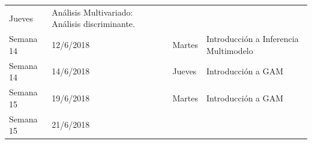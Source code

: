 \documentclass[]{book}
\theoremstyle{definition}
\theoremstyle{definition}
\theoremstyle{definition}
\theoremstyle{remark}
\begin{document}
\begin{longtable}[]{@{}llll@{}}
\begin{minipage}[t]{0.05\columnwidth}
Jueves\strut
\end{minipage} & \begin{minipage}[t]{0.69\columnwidth}\raggedright
Análisis Multivariado: Análisis discriminante.\strut
\end{minipage}\tabularnewline
\begin{minipage}[t]{0.07\columnwidth}\raggedright
Semana 14\strut
\end{minipage} & \begin{minipage}[t]{0.07\columnwidth}\raggedright
12/6/2018\strut
\end{minipage} & \begin{minipage}[t]{0.05\columnwidth}\raggedright
Martes\strut
\end{minipage} & \begin{minipage}[t]{0.69\columnwidth}\raggedright
Introducción a Inferencia Multimodelo\strut
\end{minipage}\tabularnewline
\begin{minipage}[t]{0.07\columnwidth}\raggedright
Semana 14\strut
\end{minipage} & \begin{minipage}[t]{0.07\columnwidth}\raggedright
14/6/2018\strut
\end{minipage} & \begin{minipage}[t]{0.05\columnwidth}\raggedright
Jueves\strut
\end{minipage} & \begin{minipage}[t]{0.69\columnwidth}\raggedright
Introducción a GAM\strut
\end{minipage}\tabularnewline
\begin{minipage}[t]{0.07\columnwidth}\raggedright
Semana 15\strut
\end{minipage} & \begin{minipage}[t]{0.07\columnwidth}\raggedright
19/6/2018\strut
\end{minipage} & \begin{minipage}[t]{0.05\columnwidth}\raggedright
Martes\strut
\end{minipage} & \begin{minipage}[t]{0.69\columnwidth}\raggedright
Introducción a GAM\strut
\end{minipage}\tabularnewline
\begin{minipage}[t]{0.07\columnwidth}\raggedright
Semana 15\strut
\end{minipage} & \begin{minipage}[t]{0.07\columnwidth}\raggedright
21/6/2018\strut
\end{minipage} & \begin{minipage}[t]{0.05\columnwidth}\raggedright

\end{minipage}
\end{longtable}
\end{document}
